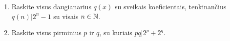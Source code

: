 \begin{enumerate}
  \item Raskite visus daugianarius $q(x)$ su sveikais koeficientais,
    tenkinančius $q(n)|2^n - 1$ su visais $n \in \mathbb N$.
  \item Raskite visus pirminius $p$ ir $q$, su kuriais $pq|2^p + 2^q$.

\end{enumerate}
